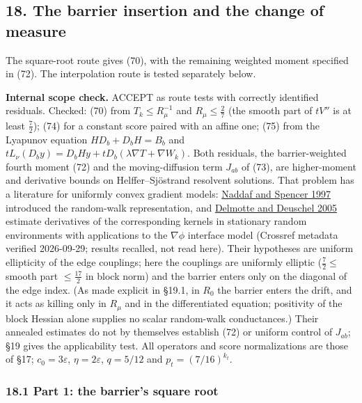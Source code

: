 \documentclass[11pt,a4paper]{article}
\begin{document}
\hypertarget{the-barrier-insertion-and-the-change-of-measure}{%
\subsection{18. The barrier insertion and the change of
measure}\label{the-barrier-insertion-and-the-change-of-measure}}

The square-root route gives (70), with the remaining weighted moment
specified in (72). The interpolation route is tested separately below.

\textbf{Internal scope check.} ACCEPT as route tests with correctly
identified residuals. Checked: (70) from \(T_k\le R_\mu^{-1}\) and
\(R_\mu\le\frac27\) (the smooth part of \(tV''\) is at least
\(\frac72\)); (74) for a constant score paired with an affine one; (75)
from the Lyapunov equation \(HD_b+D_bH=B_b\) and
\(tL_\nu(D_by)=D_bHy+tD_b(\lambda\nabla T+\nabla W_k)\). Both residuals,
the barrier-weighted fourth moment (72) and the moving-diffusion term
\(J_{ab}\) of (73), are higher-moment and derivative bounds on
Helffer--Sjöstrand resolvent solutions. That problem has a literature
for uniformly convex gradient models:
\href{https://doi.org/10.1007/BF02509796}{Naddaf and Spencer 1997}
introduced the random-walk representation, and
\href{https://doi.org/10.1007/s00440-005-0430-y}{Delmotte and Deuschel
2005} estimate derivatives of the corresponding kernels in stationary
random environments with applications to the \(\nabla\phi\) interface
model (Crossref metadata verified 2026-09-29; results recalled, not read
here). Their hypotheses are uniform ellipticity of the edge couplings;
here the couplings are uniformly elliptic (\(\frac72\le\) smooth part
\(\le\frac{17}2\) in block norm) and the barrier enters only on the
diagonal of the edge index. (As made explicit in §19.1, in \(R_0\) the
barrier enters the drift, and it acts as killing only in \(R_\mu\) and
in the differentiated equation; positivity of the block Hessian alone
supplies no scalar random-walk conductances.) Their annealed estimates
do not by themselves establish (72) or uniform control of \(J_{ab}\);
§19 gives the applicability test. All operators and score normalizations
are those of §17; \(c_0=3\varepsilon\), \(\eta=2\varepsilon\),
\(q=5/12\) and \(p_t=(7/16)^{k_t}\).

\hypertarget{part-1-the-barriers-square-root}{%
\subsubsection{18.1 Part 1: the barrier's square
root}\label{part-1-the-barriers-square-root}}
\end{document}
